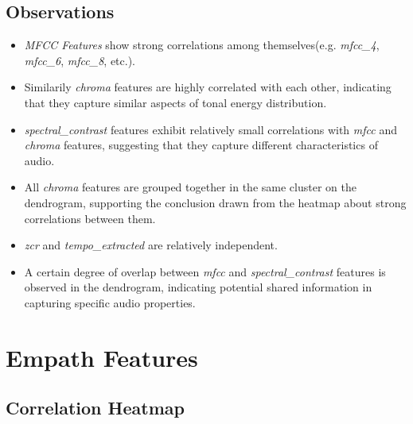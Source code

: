 \subsection*{Observations}
\begin{itemize}
  \item \textit{MFCC Features} show strong correlations among themselves(e.g.
    \textit{mfcc\_4}, \textit{mfcc\_6}, \textit{mfcc\_8}, etc.).
  \item Similarily \textit{chroma} features are highly correlated with each
    other, indicating that  they capture similar aspects of tonal energy
    distribution.
  \item \textit{spectral\_contrast} features exhibit relatively small
    correlations with \textit{mfcc} and  \textit{chroma} features, suggesting
    that they capture different characteristics of audio.
  \item All \textit{chroma} features are grouped together in the same cluster
    on the dendrogram, supporting the conclusion drawn from the heatmap about
    strong correlations between them.
  \item \textit{zcr} and \textit{tempo\_extracted} are relatively independent.
  \item A certain degree of overlap between \textit{mfcc} and
    \textit{spectral\_contrast} features is observed in the dendrogram,
    indicating potential shared information in capturing specific audio
    properties.
\end{itemize}



\section{Empath Features}

\subsection*{Correlation Heatmap}
\label{sec:correlationheatmapsspotifyfeatures}

